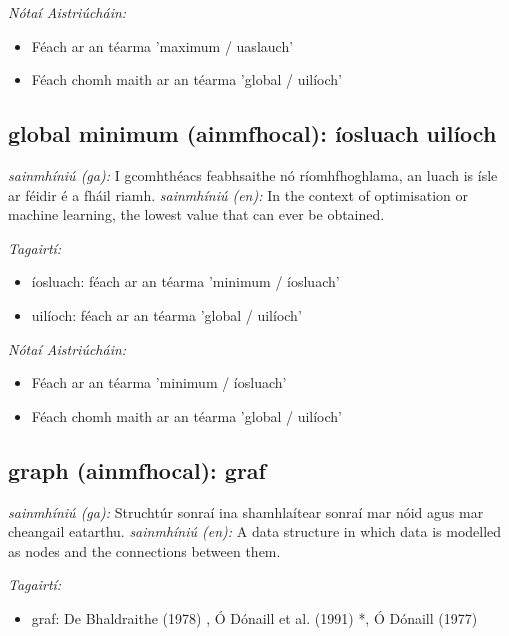 \documentclass{article}
\begin{document}
 \noindent \textit{Nótaí Aistriúcháin:}
\begin{itemize}
	\item Féach ar an téarma 'maximum / uaslauch'
	\item Féach chomh maith ar an téarma 'global / uilíoch'
\end{itemize}


\subsection*{global minimum (ainmfhocal): íosluach uilíoch} 
 \noindent \textit{sainmhíniú (ga):} I gcomhthéacs feabhsaithe nó ríomhfhoghlama, an luach is  ísle ar féidir é a fháil riamh.
\newline\newline
 \noindent \textit{sainmhíniú (en):} In the context of optimisation or machine learning, the lowest value that can ever be obtained.
\newline

 \noindent \textit{Tagairtí:}
\begin{itemize}
	\item íosluach: féach ar an téarma 'minimum / íosluach'
	\item uilíoch: féach ar an téarma 'global / uilíoch'
\end{itemize}

 \noindent \textit{Nótaí Aistriúcháin:}
\begin{itemize}
	\item Féach ar an téarma 'minimum / íosluach'
	\item Féach chomh maith ar an téarma 'global / uilíoch'
\end{itemize}


\subsection*{graph (ainmfhocal): graf} 
 \noindent \textit{sainmhíniú (ga):} Struchtúr sonraí ina shamhlaítear sonraí mar nóid agus mar cheangail eatarthu.
\newline\newline
 \noindent \textit{sainmhíniú (en):} A data structure in which data is modelled as nodes and the connections between them.
\newline

 \noindent \textit{Tagairtí:}
\begin{itemize}
	\item graf: De Bhaldraithe (1978) \cite{de-bhaldraithe}, Ó Dónaill et al. (1991) \cite{focloir-beag}*, Ó Dónaill (1977) \cite{odonaill}
\end{itemize}
\end{document}
